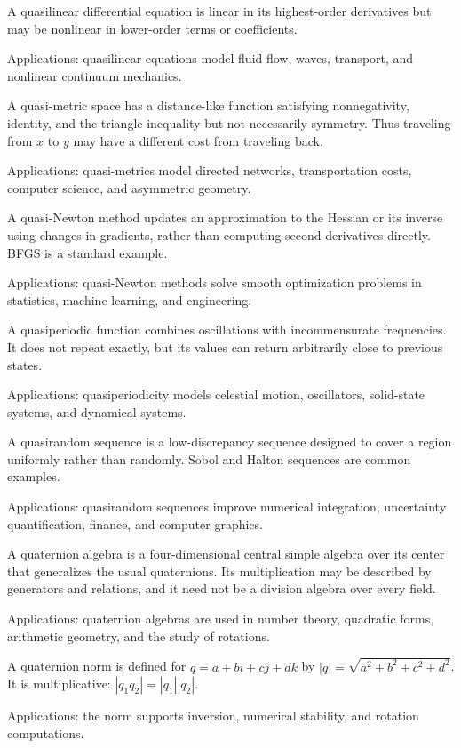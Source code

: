A quasilinear differential equation is linear in its highest-order derivatives but may be nonlinear in lower-order terms or coefficients. \par\noindent Applications: quasilinear equations model fluid flow, waves, transport, and nonlinear continuum mechanics.

A quasi-metric space has a distance-like function satisfying nonnegativity, identity, and the triangle inequality but not necessarily symmetry. Thus traveling from $x$ to $y$ may have a different cost from traveling back. \par\noindent Applications: quasi-metrics model directed networks, transportation costs, computer science, and asymmetric geometry.

A quasi-Newton method updates an approximation to the Hessian or its inverse using changes in gradients, rather than computing second derivatives directly. BFGS is a standard example. \par\noindent Applications: quasi-Newton methods solve smooth optimization problems in statistics, machine learning, and engineering.

A quasiperiodic function combines oscillations with incommensurate frequencies. It does not repeat exactly, but its values can return arbitrarily close to previous states. \par\noindent Applications: quasiperiodicity models celestial motion, oscillators, solid-state systems, and dynamical systems.

A quasirandom sequence is a low-discrepancy sequence designed to cover a region uniformly rather than randomly. Sobol and Halton sequences are common examples. \par\noindent Applications: quasirandom sequences improve numerical integration, uncertainty quantification, finance, and computer graphics.

A quaternion algebra is a four-dimensional central simple algebra over its center that generalizes the usual quaternions. Its multiplication may be described by generators and relations, and it need not be a division algebra over every field. \par\noindent Applications: quaternion algebras are used in number theory, quadratic forms, arithmetic geometry, and the study of rotations.

A quaternion norm is defined for $q=a+bi+cj+dk$ by $|q|=\sqrt{a^2+b^2+c^2+d^2}$. It is multiplicative: $|q_1q_2|=|q_1||q_2|$. \par\noindent Applications: the norm supports inversion, numerical stability, and rotation computations.

